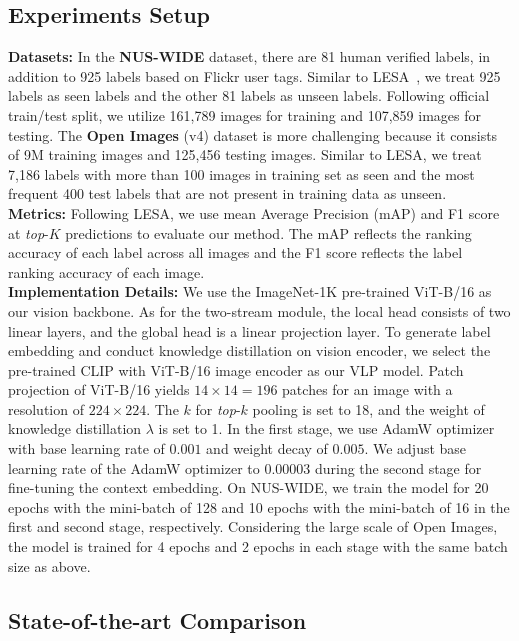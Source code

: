 \documentclass[letterpaper]{article} %
\begin{document}
\subsection{Experiments Setup}
\noindent\textbf{Datasets:} 
In the \textbf{NUS-WIDE} dataset, there are 81 human verified labels, in addition to 925 labels based on Flickr user tags. 
Similar to LESA~\cite{lesa}, we treat 925 labels as seen labels and the other 81 labels as unseen labels.
Following official train/test split, we utilize 161,789 images for training and 107,859 images for testing.
The \textbf{Open Images} (v4) dataset is more challenging because it consists of 9M training images and 125,456 testing images. 
Similar to LESA, we treat 7,186 labels with more than 100 images in training set as seen and the most frequent 400 test labels that are not present in training data as unseen. \\ 
\noindent\textbf{Metrics:} 
Following LESA, we use mean Average Precision (mAP) and F1 score at \textit{top}-$K$ predictions to evaluate our method.
The mAP reflects the ranking accuracy of each label across all images and the F1 score reflects the label ranking accuracy of each image. \\ 
\noindent\textbf{Implementation Details:} 
We use the ImageNet-1K pre-trained ViT-B/16 as our vision backbone.
As for the two-stream module, the local head consists of two linear layers, and the global head is a linear projection layer.
To generate label embedding and conduct knowledge distillation on vision encoder, we select the pre-trained CLIP with ViT-B/16 image encoder as our VLP model.
Patch projection of ViT-B/16 yields $14 \times 14=196$ patches for an image with a resolution of $224 \times 224$.
The $k$ for \textit{top}-$k$ pooling is set to 18, and the weight of knowledge distillation $\lambda$ is set to 1.
In the first stage, we use AdamW optimizer with base learning rate of $0.001$ and weight decay of $0.005$.
We adjust base learning rate of the AdamW optimizer to $0.00003$ during the second stage for fine-tuning the context embedding.
On NUS-WIDE, we train the model for 20 epochs with the mini-batch of 128 and 10 epochs with the mini-batch of 16 in the first and second stage, respectively.
Considering the large scale of Open Images, the model is trained for 4 epochs and 2 epochs in each stage with the same batch size as above.

\subsection{State-of-the-art Comparison}
\end{document}

